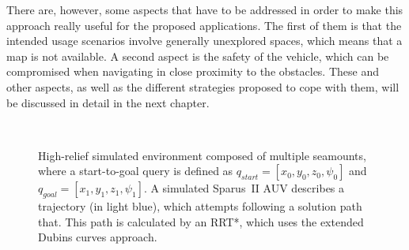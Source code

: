 There are, however, some aspects that have to be addressed in order to make this
approach really useful for the proposed applications. The first of them is that
the intended usage scenarios involve generally unexplored spaces, which means
that a map is not available. A second aspect is the safety of the vehicle, which
can be compromised when navigating in close proximity to the obstacles. These
and other aspects, as well as the different strategies proposed to cope with
them, will be discussed in detail in the next chapter.

\begin{figure}[htbp]
    \myfloatalign
     \quad %
    \\
      \quad
\caption[Simulation of the Sparus~II AUV attempting to follow a 3D solution path
in a high-relief environment. The path is calculated by an RRT* that uses the
extended Dubins curves approach.]
{High-relief simulated environment composed of multiple seamounts, where a
start-to-goal query is defined as $q_{start} = [x_0, y_0, z_0, \psi_0]$ and
$q_{goal} = [x_1, y_1, z_1, \psi_1]$. A simulated Sparus~II AUV describes a
trajectory (in light blue), which attempts following a solution path that. This
path is calculated by an RRT*, which uses the extended Dubins curves approach.}
\label{fig:S2PlannOffSeamountRRTstDubins3D}
\end{figure}


